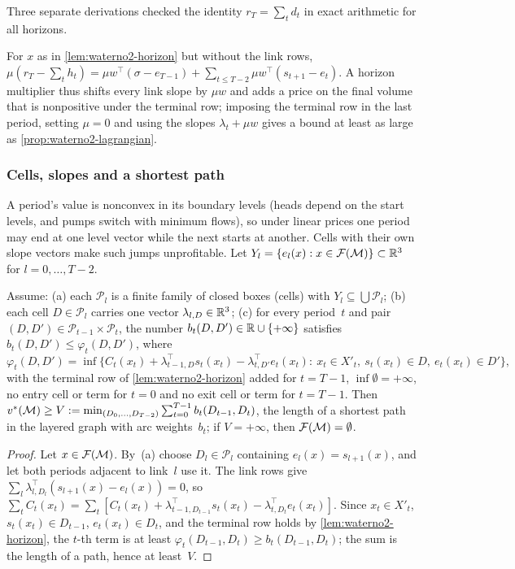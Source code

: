Three separate derivations checked the identity $r_T=\sum_td_t$ in exact arithmetic for all horizons.

\begin{remark}\label{rem:waterno2-folding}
For $x$ as in \cref{lem:waterno2-horizon} but without the link rows, $\mu(r_T-\sum_th_t)=\mu w^{\top}(\sigma-e_{T-1})+\sum_{t\le T-2}\mu w^{\top}(s_{t+1}-e_t)$.
A horizon multiplier thus shifts every link slope by $\mu w$ and adds a price on the final volume that is nonpositive under the terminal row; imposing the terminal row in the last period, setting $\mu=0$ and using the slopes $\lambda_t+\mu w$ gives a bound at least as large as \cref{prop:waterno2-lagrangian}.
\end{remark}

\subsubsection{Cells, slopes and a shortest path}\label{app:waterno2-cells}

A period's value is nonconvex in its boundary levels (heads depend on the start levels, and pumps switch with minimum flows), so under linear prices one period may end at one level vector while the next starts at another.
Cells with their own slope vectors make such jumps unprofitable.
Let $Y_l=\{e_l(x):x\in\mathcal{F}(\mathcal{M})\}\subset\mathbb{R}^3$ for $l=0,\dots,T-2$.

\begin{proposition}\label{prop:waterno2-cells}
Assume:
(a) each $\mathcal P_l$ is a finite family of closed boxes (cells) with $Y_l\subseteq\bigcup\mathcal P_l$;
(b) each cell $D\in\mathcal P_l$ carries one vector $\lambda_{l,D}\in\mathbb{R}^3$;
(c) for every period~$t$ and pair $(D,D')\in\mathcal P_{t-1}\times\mathcal P_t$, the number $b_t(D,D')\in\mathbb{R}\cup\{+\infty\}$ satisfies $b_t(D,D')\le\varphi_t(D,D')$, where
\[
\varphi_t(D,D')=\inf\bigl\{C_t(x_t)+\lambda_{t-1,D}^{\top}s_t(x_t)-\lambda_{t,D'}^{\top}e_t(x_t):\ x_t\in X'_t,\ s_t(x_t)\in D,\ e_t(x_t)\in D'\bigr\},
\]
with the terminal row of \cref{lem:waterno2-horizon} added for $t=T-1$, $\inf\emptyset=+\infty$, no entry cell or term for $t=0$ and no exit cell or term for $t=T-1$.
Then $v^{*}(\mathcal{M})\ge V:=\min_{(D_0,\dots,D_{T-2})}\sum_{t=0}^{T-1}b_t(D_{t-1},D_t)$, the length of a shortest path in the layered graph with arc weights~$b_t$; if $V=+\infty$, then $\mathcal{F}(\mathcal{M})=\emptyset$.
\end{proposition}

\begin{proof}
Let $x\in\mathcal{F}(\mathcal{M})$.
By~(a) choose $D_l\in\mathcal P_l$ containing $e_l(x)=s_{l+1}(x)$, and let both periods adjacent to link~$l$ use it.
The link rows give $\sum_l\lambda_{l,D_l}^{\top}(s_{l+1}(x)-e_l(x))=0$, so
$\sum_tC_t(x_t)=\sum_t[C_t(x_t)+\lambda_{t-1,D_{t-1}}^{\top}s_t(x_t)-\lambda_{t,D_t}^{\top}e_t(x_t)]$.
Since $x_t\in X'_t$, $s_t(x_t)\in D_{t-1}$, $e_t(x_t)\in D_t$, and the terminal row holds by \cref{lem:waterno2-horizon}, the $t$-th term is at least $\varphi_t(D_{t-1},D_t)\ge b_t(D_{t-1},D_t)$; the sum is the length of a path, hence at least~$V$.
\end{proof}

